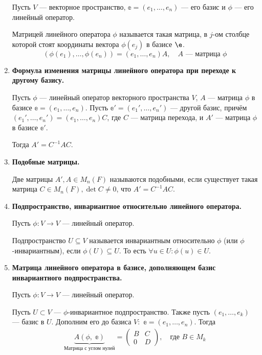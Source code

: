 \begin{enumerate}
Пусть $V$ --- векторное пространство, $\mathbb{e} = (e_1, \ldots, e_n)$ --- его базис и $\phi$ --- его линейный оператор.

Матрицей линейного оператора $\phi$ называется такая матрица, в $j$-ом столбце которой стоят координаты вектора $\phi(e_j)$ в базисе $\e$.
$$
\left(\phi(e_1), \ldots, \phi(e_n)\right) = \left(e_1, \ldots, e_n\right)A, \quad A \text{ --- матрица $\phi$}
$$

\item \textbf{Формула изменения матрицы линейного оператора при переходе к другому базису.}

Пусть $\phi$ --- линейный оператор векторного пространства $V$, $A$ --- матрица $\phi$ в базисе $\mathbb{e} = (e_1, \ldots, e_n)$. Пусть $\mathbb{e}' = (e_1', \ldots, e_n')$ --- другой базис, причём $(e_1', \ldots, e_n') = (e_1, \ldots, e_n)C$, где $C$ --- матрица перехода, и $A'$ --- матрица $\phi$ в базисе $\mathbb{e}'$.

Тогда $A' = C^{-1}AC$.

\item \textbf{Подобные матрицы.}

Две матрицы $A', A \in M_n(F)$ называются подобными, если существует такая матрица $C \in M_n(F), \det C \neq 0$, что $A' = C^{-1}AC$.

\item \textbf{Подпространство, инвариантное относительно линейного оператора.}

Пусть $\phi\colon V \rightarrow V$ --- линейный оператор.

Подпространство $U \subseteq V$ называется инвариантным относительно $\phi$ (или $\phi$-инвариантным), если $\phi(U)\subseteq U$. То есть $\forall u\in U \colon \phi(u)\in U$. 

\item \textbf{Матрица линейного оператора в базисе, дополняющем базис инвариантного подпространства.}

Пусть $\phi\colon V \rightarrow V$ --- линейный оператор.

Пусть $U\subset V$ --- $\phi$-инвариантное подпространство. Также пусть $(e_1, \ldots, e_k)$ --- базис в $U$. Дополним его до базиса $V\colon$ $\mathbb{e} = (e_1, \ldots, e_n)$. Тогда
\begin{gather}
    \underbrace{A(\phi,\;\mathbb{e})}_{\text{Матрица с углом нулей}} = \begin{pmatrix}
    B& C \\
    0& D
    \end{pmatrix}, \quad\text{где $B\in M_k$}
\end{gather}


\end{enumerate}
